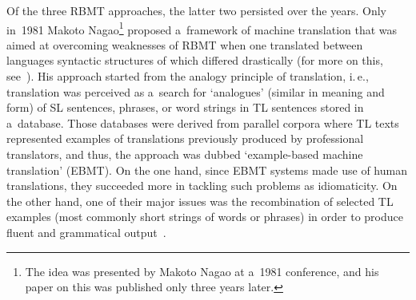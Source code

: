 \begin{multicols}{2}
  Of the three RBMT approaches, the latter two persisted over the years. Only 
in~1981 Makoto Nagao\footnote{The idea was presented by Makoto Nagao at a~1981 
conference, and his paper on this was published only three years later.} proposed
 a~framework 
of machine translation that was aimed at overcoming weaknesses of RBMT when 
one translated between languages syntactic structures of which differed drastically 
(for more on this, see~\cite{10-n, 11-n}). His approach started from the analogy 
principle of translation, i.\,e., translation was perceived as a~search for `analogues' 
(similar in meaning and form) of SL sentences, phrases, or word strings in TL 
sentences stored in a~database. Those databases were derived from parallel corpora 
where TL texts represented examples of translations previously produced by 
professional translators, and thus, the approach was dubbed `example-based 
machine translation' (EBMT). On the one hand, since EBMT systems made use of 
human translations, they succeeded more in tackling such problems as 
idiomaticity. On the other hand, one of their major issues was the recombination 
of selected TL examples (most commonly short strings of words or phrases) in 
order to produce fluent and grammatical output~\cite{8-n}.
  

\end{multicols}
